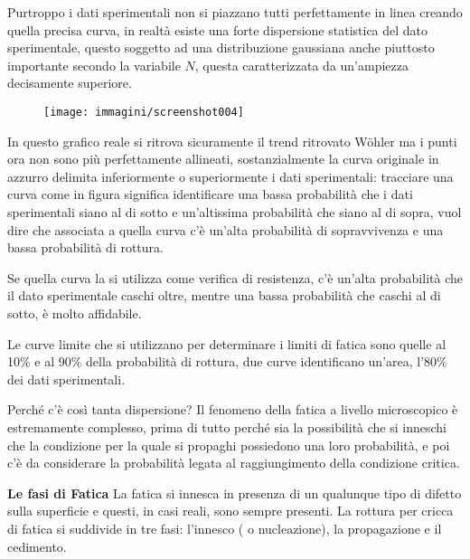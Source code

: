 \documentclass{article}
\begin{document}
\begin{adjustwidth}{2in}{}
		Purtroppo i dati sperimentali non si piazzano tutti perfettamente in linea creando quella precisa curva, in realtà esiste una forte dispersione statistica del dato sperimentale, questo soggetto ad una distribuzione gaussiana anche piuttosto importante secondo la variabile $ N $, questa caratterizzata da un'ampiezza decisamente superiore. 
		
		\begin{figure}[H]
			\centering
			\texttt{[image: immagini/screenshot004]}
			\label{fig:screenshot004}
		\end{figure}
		
		In questo grafico reale si ritrova sicuramente il trend ritrovato Wöhler ma i punti ora non sono più perfettamente allineati, sostanzialmente la curva originale in azzurro delimita inferiormente o superiormente i dati sperimentali: tracciare una curva come in figura significa identificare una bassa probabilità che i dati sperimentali siano al di sotto e un'altissima probabilità che siano al di sopra, vuol dire che associata a quella curva c'è un'alta probabilità di sopravvivenza e una bassa probabilità di rottura. 
		
		Se quella curva la si utilizza come verifica di resistenza, c'è un'alta probabilità che il dato sperimentale caschi oltre, mentre una bassa probabilità che caschi al di sotto, è molto affidabile. 
		
		Le curve limite che si utilizzano per determinare i limiti di fatica sono quelle al 10\% e al 90\% della probabilità di rottura, due curve identificano un'area, l'80\% dei dati sperimentali. \newline
		


		Perché c'è così tanta dispersione? Il fenomeno della fatica a livello microscopico è estremamente complesso, prima di tutto perché sia la possibilità che si inneschi che la condizione per la quale si propaghi possiedono una loro probabilità, e poi c'è da considerare la probabilità legata al raggiungimento della condizione critica. \newpage
		
		
		\textbf{\Large Le fasi di Fatica} \newline
		La fatica si innesca in presenza di un qualunque tipo di difetto sulla superficie e questi, in casi reali, sono sempre presenti. La rottura per cricca di fatica si suddivide in tre fasi: l'innesco ( o nucleazione), la propagazione e il cedimento. \newline
		

\end{adjustwidth}
\end{document}
